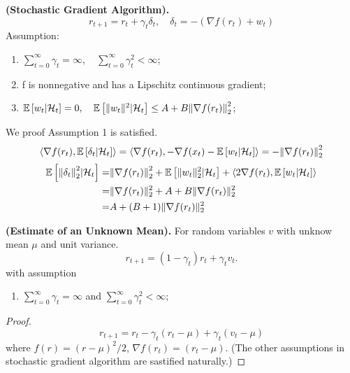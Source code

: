 \begin{example}
    \textbf{(Stochastic Gradient Algorithm).}
    \[
       r_{t+1} = r_{t} + \gamma_t \delta_t, \quad \delta_t = - \left( \nabla f(r_t) + w_t \right)   
    \]
    Assumption:
    \begin{enumerate}
        \item $ \sum^{\infty}_{t=0} \gamma_t = \infty, \quad \sum^{\infty}_{t=0} \gamma^2_{t} < \infty $;
            \item f is nonnegative and has a Lipschitz continuous gradient;
            \item $ \mathbb{E}\left[ w_t | \mathcal{H}_t \right] = 0,\quad \mathbb{E}\left[ \Arrowvert w_t \Arrowvert^2 | \mathcal{H}_t \right] \le A + B {\Arrowvert \nabla f(r_t) \Arrowvert}^2_2 $;
    \end{enumerate}
    We proof Assumption 1 is satisfied.
    \[
        \langle \nabla f(r_t), \mathbb{E}\left[ \delta_t | \mathcal{H}_t \right] \rangle
        = \langle \nabla f(r_t), -\nabla f(x_t) - \mathbb{E}\left[ w_t | \mathcal{H}_t \right] \rangle
        = - {\Arrowvert \nabla f(r_t) \Arrowvert}_2^2
    \]
    \begin{align*}
        \mathbb{E}\left[ {\Arrowvert \delta_t \Arrowvert}_2^2 | \mathcal{H}_t \right]
        =& {\Arrowvert \nabla f(r_t) \Arrowvert}_2^2 + \mathbb{E}\left[ \Arrowvert w_t \Arrowvert_2^2 | \mathcal{H}_t \right] + \langle 2 \nabla f(r_t), \mathbb{E}\left[ w_t | \mathcal{H}_t \right] \rangle\\
        =& \Arrowvert \nabla f(r_t) \Arrowvert^2_2 + A + B \Arrowvert \nabla f(r_t) \Arrowvert^2_2\\
        =& A + (B+1) \Arrowvert \nabla f(r_t) \Arrowvert^2_2
    \end{align*}
\end{example}

\begin{example}
    \textbf{(Estimate of an Unknown Mean).}
    For random variables $ v $ with unknow mean $ \mu $ and unit variance.
    \[
        r_{t+1} = (1 - \gamma_t) r_t + \gamma_t v_t.
    \]
    with assumption
    \begin{enumerate}
        \item $ \sum^{\infty}_{t=0} \gamma_t = \infty $ and $ \sum^{\infty}_{t=0} \gamma^2_t < \infty $;
    \end{enumerate}
    \begin{proof}
        \[
            r_{t+1} = r_t - \gamma_t (r_t - \mu) + \gamma_t(v_t - \mu)
        \]
        where $ f(r) = {(r - \mu)}^{2}/2  $, $ \nabla f(r_t) = (r_t - \mu) $.
        (The other assumptions in stochastic gradient algorithm are sastified naturally.)
    \end{proof}
\end{example}

